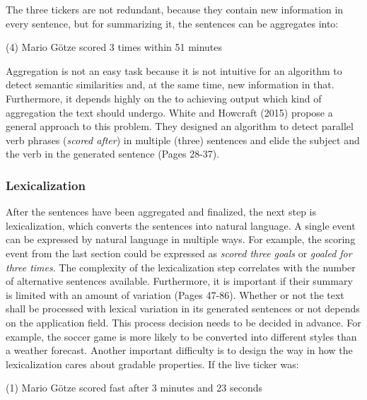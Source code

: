 The three tickers are not redundant, because they contain new information in every sentence, but for summarizing it, the sentences can be aggregates into:

\begin{tcolorbox}
	\begin{center}
		(4) Mario Götze scored 3 times within 51 minutes
	\end{center}
\end{tcolorbox}

Aggregation is not an easy task because it is not intuitive for an algorithm to detect semantic similarities and, at the same time, new information in that. Furthermore, it depends highly on the to achieving output which kind of aggregation the text should undergo. White and Howcraft (2015) propose a general approach to this problem. They designed an algorithm to detect parallel verb phrases (\textit{scored after}) in multiple (three) sentences and elide the subject and the verb in the generated sentence \cite{white-howcroft-2015-inducing} (Pages 28-37). 

\subsubsection{Lexicalization}\label{ss:lex}

After the sentences have been aggregated and finalized, the next step is lexicalization, which converts the sentences into natural language. A single event can be expressed by natural language in multiple ways. For example, the scoring event from the last section could be expressed as \textit{scored three goals} or \textit{goaled for three times}. The complexity of the lexicalization step correlates with the number of alternative sentences available. Furthermore, it is important if their summary is limited with an amount of variation \cite{Theune} (Pages 47-86). Whether or not the text shall be processed with lexical variation in its generated sentences or not depends on the application field. This process decision needs to be decided in advance. For example, the soccer game is more likely to be converted into different styles than a weather forecast. Another important difficulty is to design the way in how the lexicalization cares about gradable properties. If the live ticker was:

\begin{tcolorbox}
	\begin{center}
		(1) Mario Götze scored fast after 3 minutes and 23 seconds
	\end{center}
\end{tcolorbox}

